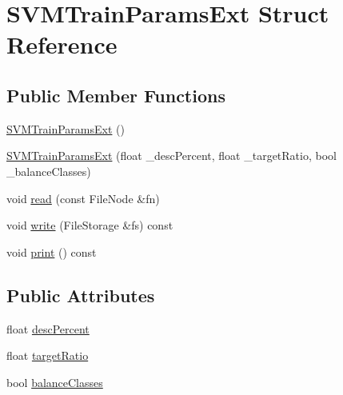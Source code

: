\hypertarget{structSVMTrainParamsExt}{\section{S\-V\-M\-Train\-Params\-Ext Struct Reference}
\label{structSVMTrainParamsExt}
}
\subsection*{Public Member Functions}
\begin{DoxyCompactItemize}
\item 
\hyperlink{structSVMTrainParamsExt_a0177ab89865d078f0fedb56752fc3233}{S\-V\-M\-Train\-Params\-Ext} ()
\item 
\hyperlink{structSVMTrainParamsExt_a3a15fad8802f7e367aeeea1eb92fcc0a}{S\-V\-M\-Train\-Params\-Ext} (float \-\_\-desc\-Percent, float \-\_\-target\-Ratio, bool \-\_\-balance\-Classes)
\item 
void \hyperlink{structSVMTrainParamsExt_a56e04fde17aa019cf1b64dc8631d412f}{read} (const File\-Node \&fn)
\item 
void \hyperlink{structSVMTrainParamsExt_a012f4fbdc13bb763f39e7d48c8f6f0eb}{write} (File\-Storage \&fs) const 
\item 
void \hyperlink{structSVMTrainParamsExt_a9413eed2aa93c88898e18d7c64037db9}{print} () const 
\end{DoxyCompactItemize}
\subsection*{Public Attributes}
\begin{DoxyCompactItemize}
\item 
float \hyperlink{structSVMTrainParamsExt_ad1203861c6c4a5a10403d3a2308d6d30}{desc\-Percent}
\item 
float \hyperlink{structSVMTrainParamsExt_a1e8099e1ff299cad8fe5c7fcf4e5fd07}{target\-Ratio}
\item 
bool \hyperlink{structSVMTrainParamsExt_a13677c5f8d3e2871193d01808ebf9726}{balance\-Classes}
\end{DoxyCompactItemize}


